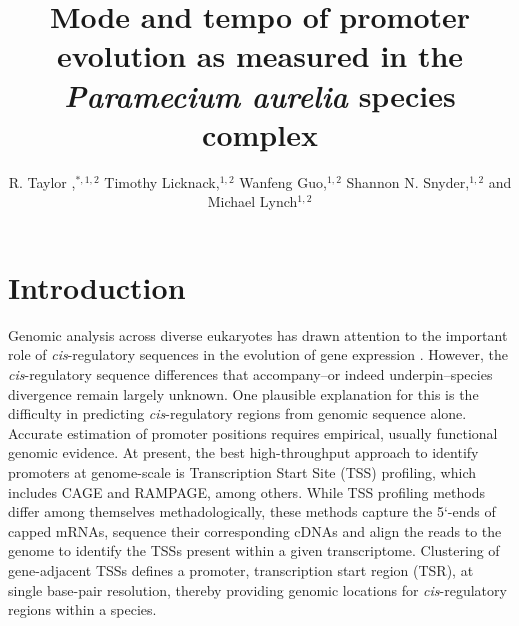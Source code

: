 \documentclass[nogrid]{MBE}%
\begin{document}
\title{Mode and tempo of promoter evolution as measured in the \textit{Paramecium aurelia} species complex}

\author[Raborn et al.]{R. Taylor ,$^{\ast,1,2}$ Timothy Licknack,$^{1,2}$ Wanfeng Guo,$^{1,2}$ Shannon N. Snyder,$^{1,2}$ and Michael Lynch$^{1,2}$}

\address{$^{1}$Biodesign Center for the Mechanisms of Evolution\\
$^{2}$School of Life Sciences\\
Arizona State University, 797 E. Tyler Street, Tempe, AZ 85281}






\maketitle


\section{{Introduction}\label{sec:Intro}}

Genomic analysis across diverse eukaryotes has drawn attention to the important role of \textit{cis}-regulatory sequences in the evolution of gene expression \citep{Wittkopp:2008ki, Wittkopp:2011bc, Siepel:2014hd}. However, the \textit{cis}-regulatory sequence differences that accompany--or indeed underpin--species divergence remain largely unknown. One plausible explanation for this is the difficulty in predicting \textit{cis}-regulatory regions from genomic sequence alone. Accurate estimation of promoter positions requires empirical, usually functional genomic evidence. At present, the best high-throughput approach to identify promoters at genome-scale is Transcription Start Site (TSS) profiling, which includes CAGE and RAMPAGE, among others. While TSS profiling methods differ among themselves methadologically, these methods capture the 5`-ends of capped mRNAs, sequence their corresponding cDNAs and align the reads to the genome to identify the TSSs present within a given transcriptome. Clustering of gene-adjacent TSSs defines a promoter, transcription start region (TSR), at single base-pair resolution, thereby providing genomic locations for \textit{cis}-regulatory regions within a species.\\
\end{document}
